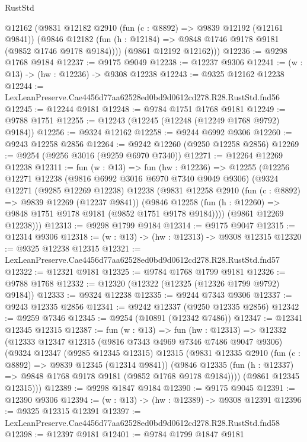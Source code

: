 \begin{lexlean}{RustStd}
\begin{coremodule}
        @12162
        (@9831
          @12182
          @2910
          (fun (c : @8892) => @9839 @12192 (@12161 @9841))
          (@9846 @12182 (fun (h : @12184) => @9848 @1746 @9178 @9181 (@9852 @1746 @9178 @9184))))
        (@9861 @12192 @12162)))
@12236 := @9298 @1768 @9184
@12237 := @9175 @9049
@12238 := @12237 @9306
@12241 := (w : @13) -> (hw : @12236) -> @9308 @12238
@12243 := @9325 @12162 @12238
@12244 := LexLeanPreserve.Cae4456d77aa62528ed0bd9d0612cd278.R28.RustStd.fnd56
@12245 := @12244 @9181
@12248 := @9784 @1751 @1768 @9181
@12249 := @9788 @1751
@12255 := @12243 (@12245 (@12248 (@12249 @1768 @9792) @9184))
@12256 := @9324 @12162
@12258 := @9244 @6992 @9306
@12260 := @9243 @12258 @2856
@12264 := @9242 @12260 (@9250 @12258 @2856)
@12269 := @9254 (@9256 @3016 (@9259 @6970 @7340))
@12271 := @12264 @12269 @12238
@12311 := fun (w : @13) =>
  fun (hw : @12236) =>
  @12255
    (@12256
      @12271
      @12238
      (@9816 @6992 @3016 @6970 @7340 @9049 @9306)
      (@9324
        @12271
        (@9285 @12269 @12238)
        @12238
        (@9831
          @12258
          @2910
          (fun (c : @8892) => @9839 @12269 (@12237 @9841))
          (@9846 @12258 (fun (h : @12260) => @9848 @1751 @9178 @9181 (@9852 @1751 @9178 @9184))))
        (@9861 @12269 @12238)))
@12313 := @9298 @1799 @9184
@12314 := @9175 @9047
@12315 := @12314 @9306
@12318 := (w : @13) -> (hw : @12313) -> @9308 @12315
@12320 := @9325 @12238 @12315
@12321 := LexLeanPreserve.Cae4456d77aa62528ed0bd9d0612cd278.R28.RustStd.fnd57
@12322 := @12321 @9181
@12325 := @9784 @1768 @1799 @9181
@12326 := @9788 @1768
@12332 := @12320 (@12322 (@12325 (@12326 @1799 @9792) @9184))
@12333 := @9324 @12238
@12335 := @9244 @7343 @9306
@12337 := @9243 @12335 @2856
@12341 := @9242 @12337 (@9250 @12335 @2856)
@12342 := @9259 @7346
@12345 := @9254 (@10891 (@12342 @7486))
@12347 := @12341 @12345 @12315
@12387 := fun (w : @13) =>
  fun (hw : @12313) =>
  @12332
    (@12333
      @12347
      @12315
      (@9816 @7343 @4969 @7346 @7486 @9047 @9306)
      (@9324
        @12347
        (@9285 @12345 @12315)
        @12315
        (@9831
          @12335
          @2910
          (fun (c : @8892) => @9839 @12345 (@12314 @9841))
          (@9846 @12335 (fun (h : @12337) => @9848 @1768 @9178 @9181 (@9852 @1768 @9178 @9184))))
        (@9861 @12345 @12315)))
@12389 := @9298 @1847 @9184
@12390 := @9175 @9045
@12391 := @12390 @9306
@12394 := (w : @13) -> (hw : @12389) -> @9308 @12391
@12396 := @9325 @12315 @12391
@12397 := LexLeanPreserve.Cae4456d77aa62528ed0bd9d0612cd278.R28.RustStd.fnd58
@12398 := @12397 @9181
@12401 := @9784 @1799 @1847 @9181

\end{coremodule}
\end{lexlean}
